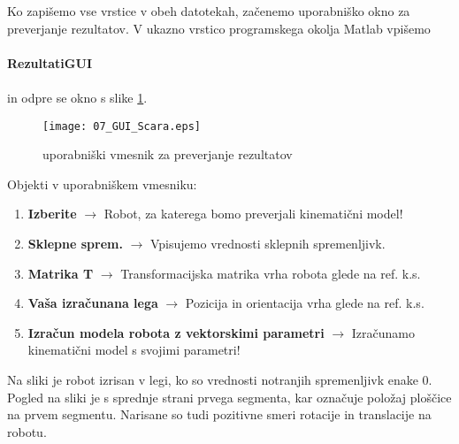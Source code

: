 Ko zapišemo vse vrstice v obeh datotekah, začenemo
uporabniško okno za preverjanje rezultatov. V ukazno vrstico programskega okolja Matlab vpišemo\\
\vspace{-0.2cm}\\%
\textbf{RezultatiGUI} \\ %
\vspace{-0.2cm}\\%
in odpre se okno s slike \ref{fGUI}.

\begin{figure}[h]
    \centering
    \texttt{[image: 07\_GUI\_Scara.eps]}
    \vspace{0.2cm}
    \caption{uporabniški vmesnik za preverjanje rezultatov}
    \label{fGUI}
\end{figure}

Objekti v uporabniškem vmesniku:

\begin{enumerate}
    \vspace{-0.2cm}%
    \item[] \textbf{Izberite} $\longrightarrow$ Robot, za katerega bomo preverjali kinematični model! %
    \vspace{-0.2cm}%
    \item[] \textbf{Sklepne sprem.} $\longrightarrow$ Vpisujemo vrednosti sklepnih spremenljivk. %
    \vspace{-0.2cm}%
    \item[] \textbf{Matrika T} $\longrightarrow$ Transformacijska matrika vrha robota glede na ref. k.s. %
    \vspace{-0.2cm}%
    \item[] \textbf{Vaša izračunana lega} $\longrightarrow$ Pozicija in orientacija vrha glede na ref. k.s. %
    \vspace{-0.2cm}%
    \item[] \textbf{Izračun modela robota z vektorskimi parametri} $\longrightarrow$ Izračunamo kinematični model s svojimi parametri! %
\end{enumerate}

Na sliki je robot izrisan v legi, ko so
vrednosti notranjih spremenljivk enake 0. Pogled na sliki je s
sprednje strani prvega segmenta, kar označuje položaj ploščice na
prvem segmentu. Narisane so tudi pozitivne smeri rotacije in
translacije na robotu.



